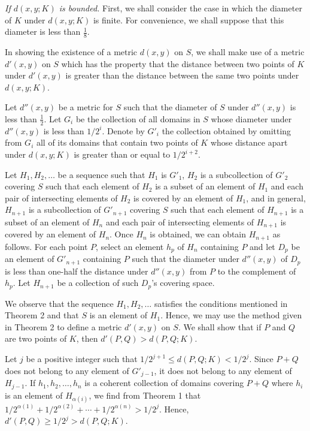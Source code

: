 \documentclass[11pt,a4paper,leqno,twoside]{article}
\begin{document}
\textit{If $d(x,y;K)$ is bounded.} First, we shall consider the case in which the diameter of $K$ under $d(x,y;K)$ is finite. For convenience, we shall suppose that this diameter is less than $\frac18$.

In showing the existence of a metric $d(x,y)$ on $S$, we shall make use of a metric $d'(x,y)$ on $S$ which has the property that the distance between two points of $K$ under $d'(x,y)$ is greater than the distance between the same two points under $d(x,y;K)$.

Let $d''(x,y)$ be a metric for $S$ such that the diameter of $S$ under $d''(x,y)$ is less than $\frac12$. Let $G_i$ be the collection of all domains in $S$ whose diameter under $d''(x,y)$ is less than $1/2^i$. Denote by $G'_i$ the collection obtained by omitting from $G_i$ all of its domains that contain two points of $K$ whose distance apart under $d(x,y;K)$ is greater than or equal to $1/2^{i+2}$.

Let $H_1,H_2,\ldots$ be a sequence such that $H_1$ is $G'_1$, $H_2$ is a subcollection of $G'_2$ covering $S$ such that each element of $H_2$ is a subset of an element of $H_1$ and each pair of intersecting elements of $H_2$ is covered by an element of $H_1$, and in general, $H_{n+1}$ is a subcollection of $G'_{n+1}$ covering $S$ such that each element of $H_{n+1}$ is a subset of an element of $H_n$ and each pair of intersecting elements of $H_{n+1}$ is covered by an element of $H_n$. Once $H_n$ is obtained, we can obtain $H_{n+1}$ as follows. For each point $P$, select an element $h_p$ of $H_n$ containing $P$ and let $D_p$ be an element of $G'_{n+1}$ containing $P$ such that the diameter under $d''(x,y)$ of $D_p$ is less than one-half the distance under $d''(x,y)$ from $P$ to the complement of $h_p$. Let $H_{n+1}$ be a collection of such $D_p$'s covering space.

We observe that the sequence $H_1,H_2,\ldots$ satisfies the conditions mentioned in Theorem 2 and that $S$ is an element of $H_1$. Hence, we may use the method given in Theorem 2 to define a metric $d'(x,y)$ on $S$. We shall show that if $P$ and $Q$ are two points of $K$, then $d'(P,Q)>d(P,Q;K)$.

Let $j$ be a positive integer such that $1/2^{j+1}\leq d(P,Q;K)<1/2^j$. Since $P+Q$ does not belong to any element of $G'_{j-1}$, it does not belong to any element of $H_{j-1}$. If $h_1,h_2,\ldots,h_n$ is a coherent collection of domains covering $P+Q$ where $h_i$ is an element of $H_{\alpha(i)}$, we find from Theorem 1 that $1/2^{\alpha(1)}+1/2^{\alpha(2)}+\cdots+1/2^{\alpha(n)}>1/2^j$. Hence, $d'(P,Q)\geq1/2^j>d(P,Q;K)$.
\end{document}
